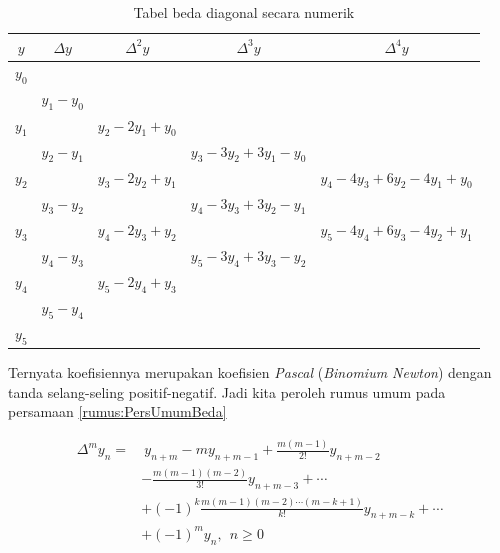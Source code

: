 \begin{table}[!htbp]
\centering
\caption{Tabel beda diagonal secara numerik}
\label{tabel:BedaDiagonalNumerik}
\begin{tabular}{@{}|c|c|c|c|c|@{}}
\hline
$y$   & $\Delta y$  & $\Delta^2 y$       & $\Delta^3 y$              & $\Delta^4 y$                     \\ \hline
$y_0$ &             &                    &                           &                                  \\
      & $y_1 - y_0$ &                    &                           &                                  \\
$y_1$ &             & $y_2 - 2y_1 + y_0$ &                           &                                  \\
      & $y_2 - y_1$ &                    & $y_3 - 3y_2 + 3y_1 - y_0$ &                                  \\
$y_2$ &             & $y_3 - 2y_2 + y_1$ &                           & $y_4 - 4y_3 + 6y_2 - 4y_1 + y_0$ \\
      & $y_3 - y_2$ &                    & $y_4 - 3y_3 + 3y_2 - y_1$ &                                  \\
$y_3$ &             & $y_4 - 2y_3 + y_2$ &                           & $y_5 - 4y_4 + 6y_3 - 4y_2 + y_1$ \\
      & $y_4 - y_3$ &                    & $y_5 - 3y_4 + 3y_3 - y_2$ &                                  \\
$y_4$ &             & $y_5 - 2y_4 + y_3$ &                           &                                  \\
      & $y_5 - y_4$ &                    &                           &                                  \\ 
$y_5$ &             &                    &                           &                                  \\ \hline
\end{tabular}
\end{table}

Ternyata koefisiennya merupakan koefisien \textit{Pascal} (\textit{Binomium Newton}) dengan tanda selang-seling positif-negatif. Jadi kita peroleh rumus umum pada persamaan \ref{rumus:PersUmumBeda}

\begin{equation}\label{rumus:PersUmumBeda}
\begin{split}
\Delta^m y_n = &~ y_{n+m} - m y_{n+m-1} + \frac{m(m-1)}{2!}y_{n+m-2} \\
		& - \frac{m(m-1)(m-2)}{3!}y_{n+m-3} + \cdots \\
		& + (-1)^k \frac{m(m-1)(m-2) \cdots (m-k+1)}{k!}y_{n+m-k} + \cdots \\
		& + (-1)^m y_n,~~n \geq 0
\end{split}
\end{equation}

